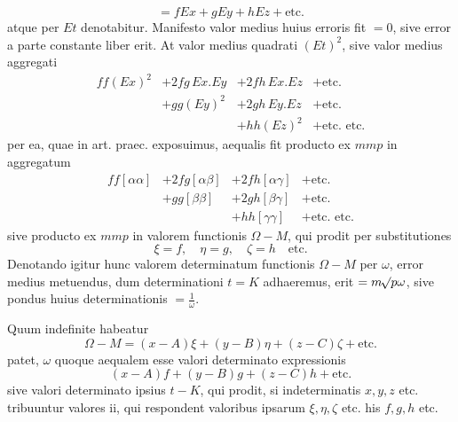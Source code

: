 \[
=fEx+gEy+hEz+\text{etc.}
\]
atque per \(Et\) denotabitur. Manifesto valor medius huius erroris fit \(=0\), sive error a parte constante liber erit. At valor medius quadrati \((Et)^2\), sive valor medius aggregati
\[
\begin{array}{llll}
ff(Ex)^2&+2fg\,Ex.Ey&+2fh\,Ex.Ez&+\text{etc.}\\
&+gg(Ey)^2&+2gh\,Ey.Ez&+\text{etc.}\\
&&+hh(Ez)^2&+\text{etc. etc.}
\end{array}
\]
per ea, quae in art. praec. exposuimus, aequalis fit producto ex \(mmp\) in aggregatum
\[
\begin{array}{llll}
ff[\alpha\alpha]&+2fg[\alpha\beta]&+2fh[\alpha\gamma]&+\text{etc.}\\
&+gg[\beta\beta]&+2gh[\beta\gamma]&+\text{etc.}\\
&&+hh[\gamma\gamma]&+\text{etc. etc.}
\end{array}
\]
sive producto ex \(mmp\) in valorem functionis \(\Omega-M\), qui prodit per substitutiones
\[
\xi=f,\quad\eta=g,\quad\zeta=h\quad\text{etc.}
\]
Denotando igitur hunc valorem determinatum functionis \(\Omega-M\) per \(\omega\), error medius metuendus, dum determinationi \(t=K\) adhaeremus, erit \(=m\mathord{{}^{}\!\surd}p\omega\), sive pondus huius determinationis \(=\frac1\omega\).

Quum indefinite habeatur
\[
\Omega-M=(x-A)\xi+(y-B)\eta+(z-C)\zeta+\text{etc.}
\]
patet, \(\omega\) quoque aequalem esse valori determinato expressionis
\[
(x-A)f+(y-B)g+(z-C)h+\text{etc.}
\]
sive valori determinato ipsius \(t-K\), qui prodit, si indeterminatis \(x,y,z\) etc. tribuuntur valores ii, qui respondent valoribus ipsarum \(\xi,\eta,\zeta\) etc. his \(f,g,h\) etc.

